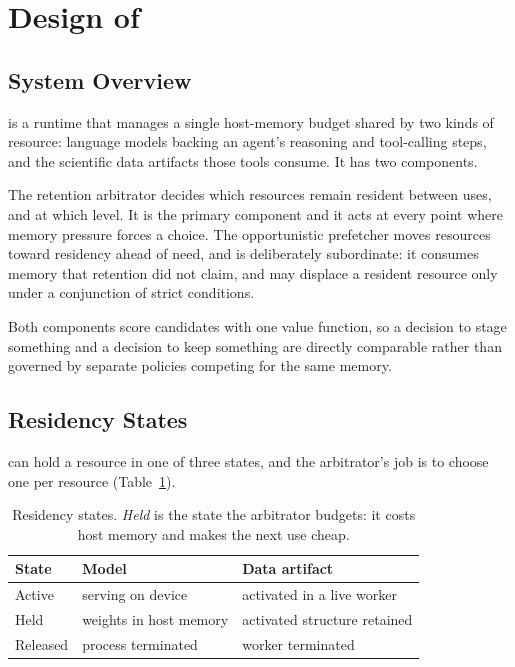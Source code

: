 \section{Design of \sysname}

\subsection{System Overview}

\sysname is a runtime that manages a single host-memory budget shared by two
kinds of resource: language models backing an agent's reasoning and
tool-calling steps, and the scientific data artifacts those tools consume. It
has two components.

The retention arbitrator decides which resources remain resident between uses,
and at which level. It is the primary component and it acts at every point
where memory pressure forces a choice. The opportunistic prefetcher moves
resources toward residency ahead of need, and is deliberately subordinate: it
consumes memory that retention did not claim, and may displace a resident
resource only under a conjunction of strict conditions.

Both components score candidates with one value function, so a decision to
stage something and a decision to keep something are directly comparable
rather than governed by separate policies competing for the same memory.

\subsection{Residency States}

\sysname can hold a resource in one of three states, and the arbitrator's job
is to choose one per resource (Table~\ref{tab:states}).

\begin{table}[t]
\centering\small
\begin{tabular}{@{}lll@{}}
\toprule
State & Model & Data artifact \\
\midrule
Active   & serving on device      & activated in a live worker \\
Held     & weights in host memory & activated structure retained \\
Released & process terminated     & worker terminated \\
\bottomrule
\end{tabular}
\caption{Residency states. \emph{Held} is the state the arbitrator budgets:
it costs host memory and makes the next use cheap.}
\label{tab:states}
\end{table}

